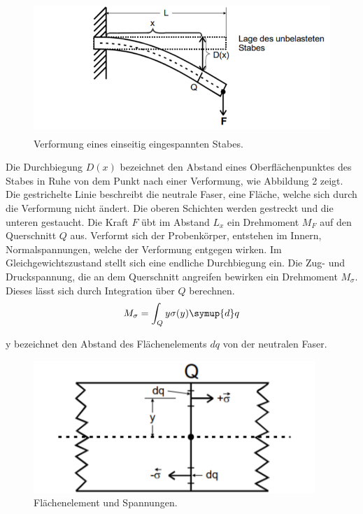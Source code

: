 \begin{figure}[H]
  \centering
  \includegraphics[height=5cm]{einseitigerstab.PNG}
  \caption{Verformung eines einseitig eingespannten Stabes. \cite{sample}}
  \label{fig:einseitigerstab}
\end{figure}

Die Durchbiegung $D(x)$ bezeichnet den Abstand eines Oberflächenpunktes des Stabes
in Ruhe von dem Punkt nach einer Verformung, wie Abbildung 2 zeigt. Die
gestrichelte Linie beschreibt die neutrale Faser, eine Fläche, welche sich durch die Verformung nicht ändert.
Die oberen Schichten werden gestreckt und die unteren gestaucht. Die Kraft $F$
übt im Abstand $L _ x$ ein Drehmoment $M_F$ auf den Querschnitt $Q$ aus. Verformt sich
der Probenkörper, entstehen im Innern, Normalspannungen, welche der Verformung
entgegen wirken. Im Gleichgewichtszustand stellt sich eine endliche Durchbiegung ein.
Die Zug- und Druckspannung, die an dem Querschnitt angreifen bewirken ein Drehmoment $M_{\sigma}$.
Dieses lässt sich durch Integration über $Q$ berechnen.
\begin{equation}
  M_{\sigma} = \int_Q y \sigma(y) \symup{d}q
\end{equation}

y bezeichnet den Abstand des Flächenelements $dq$ von der neutralen Faser.

\begin{figure}[H]
  \centering
  \includegraphics[height=5cm]{stabausschnitt.PNG}
  \caption{Flächenelement und Spannungen. \cite{sample}}
  \label{fig:stabausschnitt}
\end{figure}

